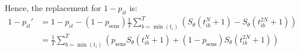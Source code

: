 \documentclass[main.tex]{subfiles}
\begin{document}
Hence, the replacement for $1 - p_{it}$ is:
\begin{align}
1 - p_{it}'
&= 1 - p_{it} - (1 - p_\text{sens})\frac{1}{T} \sum_{b=\min(t_i)}^T \left( S_\theta(t_{ib}^N + 1) - S_\theta(t_{ib}^{2N} + 1)\right) \\
&= \frac{1}{T} \sum_{b=\min(t_i)}^T \left( p_\text{sens} S_\theta(t_{ib}^N + 1) + (1 - p_\text{sens}) S_\theta(t_{ib}^{2N} + 1)\right) \\
\end{align}
\end{document}

